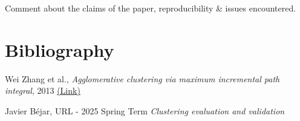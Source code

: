 \documentclass[
	10pt,
	parskip=half-,	
	paper=a4,
	english
	]{scrartcl}
\begin{document}
Comment about the claims of the paper, reproducibility \& issues encountered.

\newpage
\section{Bibliography}

\renewcommand{\section}[2]{}%
\begin{thebibliography}{9}

Wei Zhang et al.,
\textit{Agglomerative clustering via maximum incremental path integral}, 2013
\href{https://www.sciencedirect.com/science/article/pii/S0031320313001830}{(Link)}

Javier Béjar,
URL - 2025 Spring Term
\textit{Clustering evaluation and validation}

\end{thebibliography}
\end{document}
